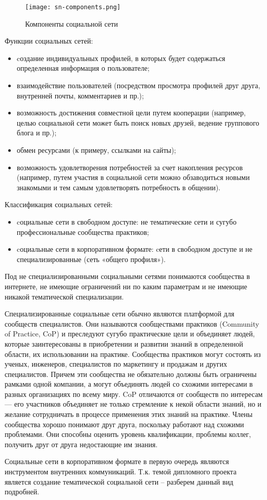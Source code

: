 \begin{figure}[H]
	\centering
	\texttt{[image: sn-components.png]} 
	\caption{Компоненты социальной сети}
	\label{fig:analysis:snComponents}
\end{figure}

Функции социальных сетей:
\begin{itemize}
	\item cоздание индивидуальных профилей, в которых будет содержаться определенная информация о пользователе;
	\item взаимодействие пользователей (посредством просмотра профилей друг друга, внутренней почты, комментариев и пр.);
	\item возможность достижения совместной цели путем кооперации (например, целью социальной сети может быть поиск новых друзей, ведение группового блога и пр.);
	\item обмен ресурсами (к примеру, ссылками на сайты);
	\item возможность удовлетворения потребностей за счет накопления ресурсов (например, путем участия в социальной сети можно обзаводиться новыми знакомыми и тем самым удовлетворять потребность в общении).
\end{itemize}

Классификация социальных сетей:
\begin{itemize}
	\item cоциальные сети в свободном доступе: не тематические сети и сугубо профессиональные сообщества практиков;
	\item cоциальные сети в корпоративном формате: cети в свободном доступе и не специализированные (сеть «общего профиля»).
\end{itemize}

Под не специализированными социальными сетями понимаются сообщества в интернете, не имеющие ограничений ни по каким параметрам и не имеющие никакой тематической специализации.

Специализированные социальные сети обычно являются платформой для сообществ специалистов. Они называются сообществами практиков (Community of Practice, CoP) и преследуют сугубо практические цели и объединяет людей, которые заинтересованы в приобретении и развитии знаний в определенной области, их использовании на практике. Сообщества практиков могут состоять из ученых, инженеров, специалистов по маркетингу и продажам и других специалистов. Причем эти сообщества не обязательно должны быть ограничены рамками одной компании, а могут объединять людей со схожими интересами в разных организациях по всему миру. CoP отличаются от сообществ по интересам — его участников объединяет не только стремление к некой области знаний, но и желание сотрудничать в процессе применения этих знаний на практике. Члены сообщества хорошо понимают друг друга, поскольку работают над схожими проблемами. Они способны оценить уровень квалификации, проблемы коллег, получить друг от друга недостающие им знания.

Социальные сети в корпоративном формате в первую очередь являются инструментом внутренних коммуникаций.
Т.к. темой дипломного проекта является создание тематической социальной сети -- разберем данный вид подробней.



